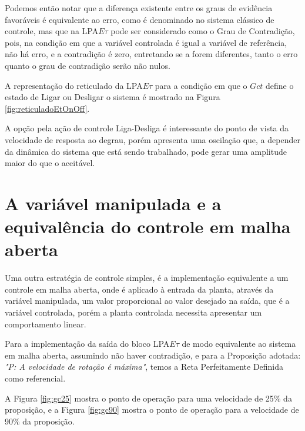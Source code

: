 




Podemos então notar que 
a diferença existente entre os graus de evidência favoráveis 
é equivalente ao erro, 
como é denominado no sistema clássico de controle, 
mas que na LPA$E\tau$ pode ser considerado como 
o Grau de Contradição, pois,
na condição em que a variável controlada é igual a 
variável de referência, não há erro, e a contradição é zero, 
entretando se a forem diferentes, 
tanto o erro quanto o grau de contradição
serão não nulos. 

A representação do reticulado da LPA$E\tau$ 
para a condição em que o $Gct$ define o estado
de Ligar ou Desligar o sistema é mostrado na 
Figura \ref{fig:reticuladoEtOnOff}.

A opção pela ação de controle Liga-Desliga
é interessante do ponto de vista da velocidade 
de resposta ao degrau, 
porém apresenta uma oscilação que, 
a depender da dinâmica do sistema que está sendo trabalhado,
pode gerar uma amplitude maior do que o aceitável.



\section{A variável manipulada e a equivalência do controle em malha aberta}

Uma outra estratégia de controle simples, 
é a implementação equivalente a um controle em malha aberta,
onde é aplicado à entrada da planta, 
através da variável manipulada,
um valor proporcional ao valor desejado na saída,
que é a variável controlada, 
porém a planta controlada necessita apresentar um 
comportamento linear. 

Para a implementação da saída do bloco 
LPA$E\tau$ de modo equivalente ao sistema em malha aberta,
assumindo não haver contradição, 
e para a Proposição adotada: 
\emph{"P: A velocidade de rotação é máxima"}, 
temos a Reta Perfeitamente Definida como referencial. 

A Figura \ref{fig:gc25} mostra o ponto de operação 
para uma velocidade de 25\% da proposição, 
e a Figura \ref{fig:gc90} mostra o ponto de operação
para a velocidade de 90\% da proposição.






